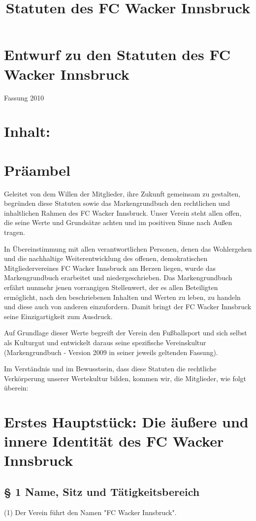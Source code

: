 \documentclass[10pt,a4paper,landscape]{article}
\title{Statuten des FC Wacker Innsbruck}
\begin{document}
\section*{Entwurf zu den Statuten des FC Wacker Innsbruck}
Fassung 2010

\section*{Inhalt:}


\section*{Präambel}

Geleitet von dem Willen der Mitglieder, ihre Zukunft gemeinsam zu gestalten, begründen diese Statuten sowie das Markengrundbuch den rechtlichen und inhaltlichen Rahmen des FC Wacker Innsbruck.
Unser Verein steht allen offen, die seine Werte und Grundsätze achten und im positiven Sinne nach Außen tragen.

In Übereinstimmung mit allen verantwortlichen Personen, denen das Wohlergehen und die nachhaltige Weiterentwicklung des offenen, demokratischen Mitgliedervereines FC Wacker Innsbruck am Herzen liegen, wurde das Markengrundbuch erarbeitet und niedergeschrieben.
Das Markengrundbuch erfährt nunmehr jenen vorrangigen Stellenwert, der es allen Beteiligten ermöglicht, nach den beschriebenen Inhalten und Werten zu leben, zu handeln und diese auch von anderen einzufordern.
Damit bringt der FC Wacker Innsbruck seine Einzigartigkeit zum Ausdruck.

Auf Grundlage dieser Werte begreift der Verein den Fußballsport und sich selbst als Kulturgut und entwickelt daraus seine spezifische Vereinskultur (Markengrundbuch - Version 2009 in seiner jeweils geltenden Fassung).

Im Verständnis und im Bewusstsein, dass diese Statuten die rechtliche Verkörperung unserer Wertekultur bilden, kommen wir, die Mitglieder, wie folgt überein:

\section*{Erstes Hauptstück: Die äußere und innere Identität des FC Wacker Innsbruck}

\subsection{§ 1 Name, Sitz und Tätigkeitsbereich}

(1) Der Verein führt den Namen "FC Wacker Innsbruck".
\end{document}
